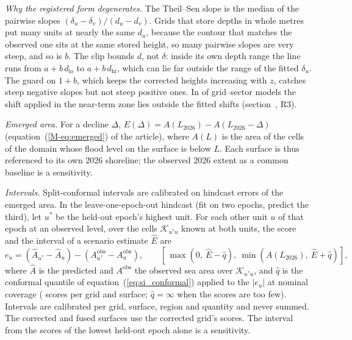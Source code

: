 \emph{Why the registered form degenerates.} The Theil--Sen slope is the median of the pairwise slopes $(\delta_u - \delta_v)/(d_u - d_v)$. Grids that store depths in whole metres put many units at nearly the same $d_u$, because the contour that matches the observed one sits at the same stored height, so many pairwise slopes are very steep, and so is $b$. The clip bounds $d$, not $\delta$: inside its own depth range the line runs from $a + b\,d_{\mathrm{lo}}$ to $a + b\,d_{\mathrm{hi}}$, which can lie far outside the range of the fitted $\delta_u$. The guard on $1 + b$, which keeps the corrected heights increasing with $z$, catches steep negative slopes but not steep positive ones. In  of  grid--sector models the shift applied in the near-term zone lies outside the fitted shifts (section~\SIredteam, R3).

\emph{Emerged area.} For a decline $\Delta$, $E(\Delta) = A(L_{2026}) - A(L_{2026} - \Delta)$ (equation~(\ref{M-eq:emerged}) of the article), where $A(L)$ is the area of the cells of the domain whose flood level on the surface is below $L$. Each surface is thus referenced to its own 2026 shoreline; the observed 2026 extent as a common baseline is a sensitivity.

\emph{Intervals.} Split-conformal intervals\citep{lei2018} are calibrated on hindcast errors of the emerged area. In the leave-one-epoch-out hindcast (fit on two epochs, predict the third), let $u^{\ast}$ be the held-out epoch's highest unit. For each other unit $u$ of that epoch at an observed level, over the cells $\mathcal{K}_{u^{\ast} u}$ known at both units, the score and the interval of a scenario estimate $\hat{E}$ are
\begin{equation}
  e_u = \left(\hat{A}_{u^{\ast}} - \hat{A}_{u}\right) - \left(A^{\mathrm{obs}}_{u^{\ast}} - A^{\mathrm{obs}}_{u}\right) , \qquad
  \left[\, \max\!\left(0,\ \hat{E} - \hat{q}\right) ,\ \min\!\left(A(L_{2026}),\ \hat{E} + \hat{q}\right) \right] ,
  \label{eq:si_h3interval}
\end{equation}
where $\hat{A}$ is the predicted and $A^{\mathrm{obs}}$ the observed sea area over $\mathcal{K}_{u^{\ast} u}$, and $\hat{q}$ is the conformal quantile of equation~(\ref{eq:si_conformal}) applied to the $\lvert e_u \rvert$ at nominal coverage  ( scores per grid and surface; $\hat{q} = \infty$ when the scores are too few). Intervals are calibrated per grid, surface, region and quantity and never summed. The corrected and fused surfaces use the corrected grid's scores. The interval from the scores of the lowest held-out epoch alone is a sensitivity.

